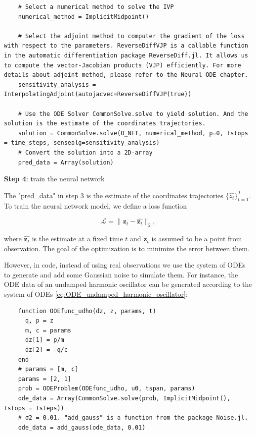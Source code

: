 \documentclass[
	parskip, 			   %
	twoside, 			   %
	DIV=14, 			   %
	BCOR=15.0mm, 		   %
	headsepline, 		   %
	open=right, 		   %
	captions=tableheading, %
	bibliography=totoc,    %
	numbers=noenddot       %
]{scrreprt}
\begin{document}
\begin{verbatim}
    # Select a numerical method to solve the IVP
    numerical_method = ImplicitMidpoint()
    
    # Select the adjoint method to computer the gradient of the loss with respect to the parameters. ReverseDiffVJP is a callable function in the automatic differentiation package ReverseDiff.jl. It allows us to compute the vector-Jacobian products (VJP) efficiently. For more details about adjoint method, please refer to the Neural ODE chapter.
    sensitivity_analysis = InterpolatingAdjoint(autojacvec=ReverseDiffVJP(true))
    
    # Use the ODE Solver CommonSolve.solve to yield solution. And the solution is the estimate of the coordinates trajectories.
    solution = CommonSolve.solve(O_NET, numerical_method, p=θ, tstops = time_steps, sensealg=sensitivity_analysis)
    # Convert the solution into a 2D-array
    pred_data = Array(solution)
\end{verbatim}

\textbf{Step 4}: train the neural network

The "pred\_data" in step 3 is the estimate of the coordinates trajectories $\{ \hat{z_{t}} \}_{t=1}^{T}$. To train the neural network model, we define a loss function

\begin{equation}
    \label{eq:loss_O-NET}
    \mathcal{L} = \lVert \mathbf{z}_{t} - \hat{\mathbf{z}_{t}} \rVert_{2},
\end{equation}

where $\hat{\mathbf{z}_{t}}$ is the estimate at a fixed time $t$ and $\mathbf{z}_{t}$ is assumed to be a point from observation. The goal of the optimization is to minimize the error between them.

However, in code, instead of using real observations we use the system of ODEs to generate and add some Gaussian noise to simulate them. For instance, the ODE data of an undamped harmonic oscillator can be generated according to the system of ODEs \ref{eq:ODE_undamped_harmonic_oscillator}:

\begin{verbatim}
    function ODEfunc_udho(dz, z, params, t)
      q, p = z
      m, c = params
      dz[1] = p/m
      dz[2] = -q/c
    end
    # params = [m, c]
    params = [2, 1] 
    prob = ODEProblem(ODEfunc_udho, u0, tspan, params)
    ode_data = Array(CommonSolve.solve(prob, ImplicitMidpoint(), tstops = tsteps))
    # σ2 = 0.01. "add_gauss" is a function from the package Noise.jl.
    ode_data = add_gauss(ode_data, 0.01)
\end{verbatim}
\end{document}
